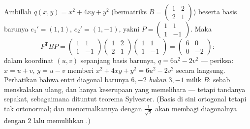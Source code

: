 \begin{example}\label{ex:b2:quadratic:congruence}
Ambillah $q(x, y) = x^2 + 4xy + y^2$ (bermatriks $B = \begin{pmatrix} 1
& 2\\ 2 & 1\end{pmatrix}$) beserta basis barunya $e_1' = (1, 1)$,
$e_2' = (1, -1)$, yakni $P = \begin{pmatrix} 1 & 1\\ 1 &
-1\end{pmatrix}$. Maka
\[
P^{\mathsf T}BP
= \begin{pmatrix} 1 & 1\\ 1 & -1\end{pmatrix}
\begin{pmatrix} 1 & 2\\ 2 & 1\end{pmatrix}
\begin{pmatrix} 1 & 1\\ 1 & -1\end{pmatrix}
= \begin{pmatrix} 6 & 0\\ 0 & -2\end{pmatrix} :
\]
dalam koordinat $(u, v)$ sepanjang basis barunya, $q = 6u^2 -
2v^2$ --- periksa: $x = u + v$, $y = u - v$ memberi $x^2 + 4xy +
y^2 = 6u^2 - 2v^2$ secara langsung. Perhatikan bahwa entri diagonal
barunya $6, -2$ \emph{bukan}  $3, -1$ milik $B$: sebab
 menskalakan ulang, dan hanya keserupaan yang memelihara
 --- tetapi tandanya sepakat, sebagaimana dituntut teorema
Sylvester. (Basis di sini ortogonal tetapi tak ortonormal; dan
menormalkannya dengan $\frac{1}{\sqrt2}$ akan membagi diagonalnya
dengan $2$ lalu memulihkan .)
\end{example}

